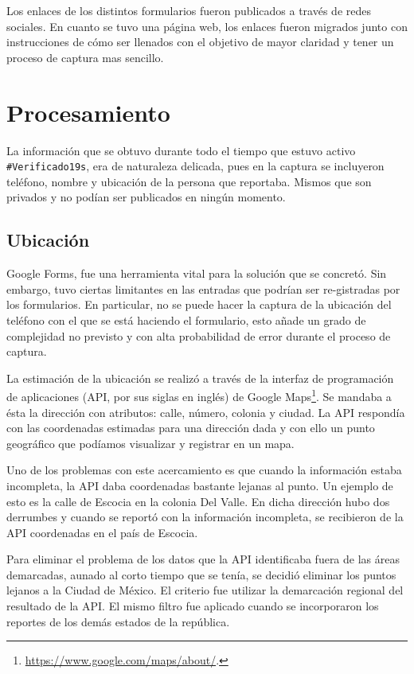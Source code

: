 \documentclass[12pt,spanish,oneside,breaklinks]{book}
\begin{document}
Los enlaces de los distintos formularios fueron publicados a través de redes sociales. En cuanto se tuvo una página web, los enlaces fueron migrados junto con instrucciones de cómo ser llenados con el objetivo de mayor claridad y tener un proceso de captura mas sencillo.

\section{Procesamiento}
\label{sec:org592dfbe}

La información que se obtuvo durante todo el tiempo que estuvo activo \texttt{\#Verificado19s}, era de naturaleza delicada, pues en la captura se incluyeron teléfono, nombre y ubicación de la persona que reportaba. Mismos que son privados y  no podían ser publicados en ningún momento.

\subsection{Ubicación}
\label{sec:org3479344}

Google Forms, fue una herramienta vital para la solución que se concretó. Sin embargo, tuvo ciertas limitantes en las entradas que podrían ser re-gistradas por los formularios. En particular, no se puede hacer la captura de la ubicación del teléfono con el que se está haciendo el formulario, esto añade un grado de complejidad no previsto y con alta probabilidad de error durante el proceso de captura.

La estimación de la ubicación se realizó a través de la interfaz de programación de aplicaciones (API, por sus siglas en inglés) de Google Maps\footnote{\url{https://www.google.com/maps/about/}.}. Se mandaba a ésta la dirección con atributos: calle, número, colonia y ciudad. La API respondía con las coordenadas estimadas para una dirección dada y con ello un punto geográfico que podíamos visualizar y registrar en un mapa.

Uno de los problemas con este acercamiento es que cuando la información estaba incompleta, la API daba coordenadas bastante lejanas al punto. Un ejemplo de esto es la calle de Escocia en la colonia Del Valle. En dicha dirección hubo dos derrumbes y cuando se reportó con la información incompleta, se recibieron de la API coordenadas en el país de Escocia.

Para eliminar el problema de los datos que la API identificaba fuera de las áreas demarcadas, aunado al corto tiempo que se tenía, se decidió eliminar los puntos lejanos a la Ciudad de México. El criterio fue utilizar la demarcación regional del resultado de la API. El mismo filtro fue aplicado cuando se incorporaron los reportes de los demás estados de la república. 
\end{document}
